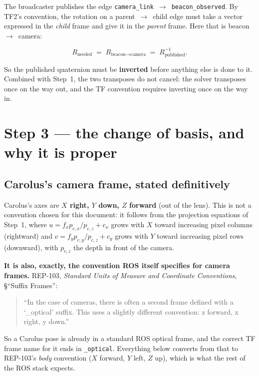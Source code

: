 \documentclass[11pt]{report}
\begin{document}
The broadcaster publishes the edge
\texttt{camera\_link}~$\rightarrow$~\texttt{beacon\_observed}. By TF2's
convention, the rotation on a parent~$\rightarrow$~child edge must take a
vector expressed in the \emph{child} frame and give it in the \emph{parent}
frame. Here that is beacon~$\rightarrow$~camera:

\[
R_{\text{needed}} \;=\; R_{\text{beacon}\to\text{camera}}
\;=\; R_{\text{published}}^{-1}.
\]

So the published quaternion must be \textbf{inverted} before anything else is
done to it. Combined with Step~1, the two transposes do not cancel: the
solver transposes once on the way out, and the TF convention requires
inverting once on the way in.

\section{Step 3 --- the change of basis, and why it is proper}

\subsection{Carolus's camera frame, stated definitively}
\label{sec:carolus-frame}

Carolus's axes are \textbf{$X$ right, $Y$ down, $Z$ forward} (out of the
lens). This is not a convention chosen for this document: it follows from
the projection equations of Step~1, where $u = f_x p_{c,x}/p_{c,z} + c_x$
grows with $X$ toward increasing pixel columns (rightward) and
$v = f_y p_{c,y}/p_{c,z} + c_y$ grows with $Y$ toward increasing pixel rows
(downward), with $p_{c,z}$ the depth in front of the camera.

\textbf{It is also, exactly, the convention ROS itself specifies for camera
frames.} REP-103, \emph{Standard Units of Measure and Coordinate
Conventions}, §``Suffix Frames'':

\begin{quote}
``In the case of cameras, there is often a second frame defined with a
`\_optical' suffix. This uses a slightly different convention: z forward,
x right, y down.''
\end{quote}

So a Carolus pose is already in a standard ROS optical frame, and the
correct TF frame name for it ends in \texttt{\_optical}. Everything below
converts from that to REP-103's \emph{body} convention ($X$ forward,
$Y$ left, $Z$ up), which is what the rest of the ROS stack expects.
\end{document}
